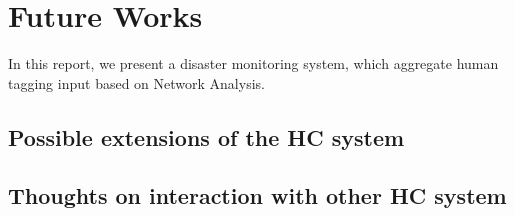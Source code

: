 \section{Future Works}

In this report, we present a disaster monitoring system, which aggregate human tagging input based on
Network Analysis. 


\subsection{Possible extensions of the HC system}
\subsection{Thoughts on interaction with other HC system}
